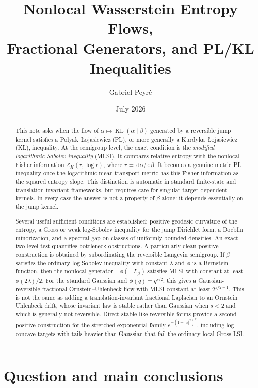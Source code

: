 \documentclass[11pt]{article}
\title{Nonlocal Wasserstein Entropy Flows,\\
Fractional Generators, and PL/KL Inequalities}
\author{Gabriel Peyr\'e}
\date{July 2026}
\theoremstyle{definition}
\DeclareMathOperator{\KL}{KL}
\newcommand{\dd}{\,\mathrm d}
\newcommand{\cE}{\mathcal E}
\newcommand{\abs}[1]{\left\lvert #1\right\rvert}
\begin{document}
\maketitle

\begin{abstract}
This note asks when the flow of
$\alpha\mapsto\KL(\alpha\mid\beta)$ generated by a reversible jump kernel
satisfies a Polyak--{\L}ojasiewicz (PL), or more generally a
Kurdyka--{\L}ojasiewicz (KL), inequality.  At the semigroup level, the exact
condition is the \emph{modified logarithmic Sobolev inequality} (MLSI).  It
compares relative entropy with the nonlocal Fisher information
$\cE_K(r,\log r)$, where $r=\dd\alpha/\dd\beta$.  It becomes a genuine metric
PL inequality once the logarithmic-mean transport metric has this Fisher
information as the squared entropy slope.  This distinction is automatic in
standard finite-state and translation-invariant frameworks, but requires
care for singular target-dependent kernels.  In every case the answer is not
a property of $\beta$ alone: it depends essentially on the jump kernel.

Several useful sufficient conditions are established: positive geodesic
curvature of the entropy, a Gross or weak log-Sobolev inequality for the jump
Dirichlet form, a Doeblin minorization, and a spectral gap on classes of
uniformly bounded densities.  An exact two-level test quantifies bottleneck
obstructions.  A particularly clean positive construction is obtained by
subordinating the reversible Langevin semigroup.  If $\beta$
satisfies the ordinary log-Sobolev inequality with constant $\lambda$ and
$\phi$ is a Bernstein function, then the nonlocal generator
$-\phi(-L_\beta)$ satisfies MLSI with constant at least
$\phi(2\lambda)/2$.  For the standard Gaussian and
$\phi(q)=q^{s/2}$, this gives a Gaussian-reversible fractional
Ornstein--Uhlenbeck flow with MLSI constant at least $2^{s/2-1}$.
This is not the same as adding a translation-invariant fractional Laplacian
to an Ornstein--Uhlenbeck drift, whose invariant law is stable rather than
Gaussian when $s<2$ and which is generally not reversible.  Direct
stable-like reversible forms provide a second positive construction for the
stretched-exponential family $e^{-(1+\abs x^2)^q}$, including log-concave
targets with tails heavier than Gaussian that fail the ordinary local Gross
LSI.
\end{abstract}

\tableofcontents

\section{Question and main conclusions}
\end{document}
